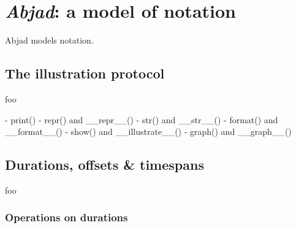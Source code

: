 \chapter{\emph{Abjad}: a model of notation}
\label{chap:a-model-of-notation}

\begin{comment}
<abjad>[hide=true]
import collections
import consort
</abjad>
\end{comment}

Abjad models notation.

\section{The illustration protocol}

foo

\begin{markdown}
-   print()
-   repr() and __repr__()
-   str() and __str__()
-   format() and __format__()
-   show() and __illustrate__()
-   graph() and __graph__()
\end{markdown}

\section{Durations, offsets \& timespans}

foo

\subsection{Operations on durations}

\begin{comment}
<abjad>
Duration(1, 2) + Duration(3, 4)
Offset(1, 2) + Duration(3, 4)
Offset(7, 8) - Offset(1, 12)
</abjad>
\end{comment}

